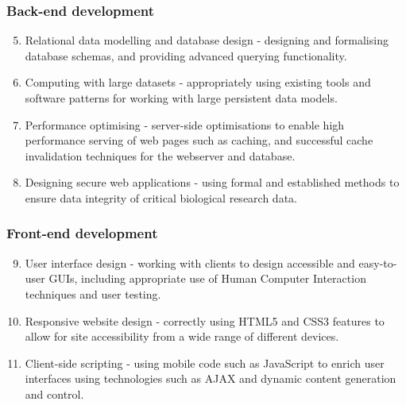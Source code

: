 \subsubsection{Back-end development}

\begin{enumerate}
\setcounter{enumi}{4}
\item Relational data modelling and database design - designing and formalising
  database schemas, and providing advanced querying functionality.
\item Computing with large datasets - appropriately using existing tools and
  software patterns for working with large persistent data models.
\item Performance optimising - server-side optimisations to enable high
  performance serving of web pages such as caching, and successful cache
  invalidation techniques for the webserver and database.
\item Designing secure web applications - using formal and established methods
  to ensure data integrity of critical biological research data.
\end{enumerate}

\subsubsection{Front-end development}
\begin{enumerate}
\setcounter{enumi}{8}
\item User interface design - working with clients to design accessible and
  easy-to-user GUIs, including appropriate use of Human Computer Interaction
  techniques and user testing.
\item Responsive website design - correctly using HTML5 and CSS3 features to
  allow for site accessibility from a wide range of different devices.
\item Client-side scripting - using mobile code such as JavaScript to enrich
  user interfaces using technologies such as AJAX and dynamic content generation
  and control.
\end{enumerate}
